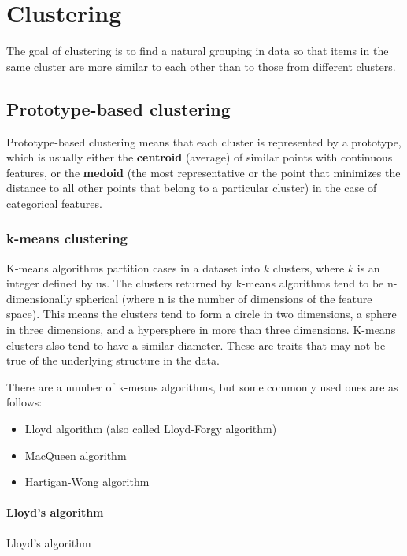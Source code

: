 \chapter{Clustering}
The goal of clustering is to find a natural grouping in data so that items in the same cluster are more similar to each other than to those from different clusters.
\section{Prototype-based clustering}
Prototype-based clustering means that each cluster is represented by a prototype, which is usually either the \textbf{centroid} (average) of similar points with continuous features, or the \textbf{medoid} (the most representative or the point that minimizes the distance to all other points that belong to a particular cluster) in the case of categorical features.
\subsection{k-means clustering}
K-means algorithms partition cases in a dataset into $k$ clusters, where $k$ is an integer defined by us. The clusters returned by k-means algorithms tend to be n-dimensionally spherical (where n is the number of dimensions of the feature space). This means the clusters tend to form a circle in two dimensions, a sphere in three dimensions, and a hypersphere in more than three dimensions. K-means clusters also tend to have a similar diameter. These are traits that may not be true of the underlying structure in the data.

There are a number of k-means algorithms, but some commonly used ones are as follows:
\begin{itemize}
    \item  Lloyd algorithm (also called Lloyd-Forgy algorithm)
    \item MacQueen algorithm
    \item Hartigan-Wong algorithm
\end{itemize}
\subsubsection*{Lloyd’s algorithm}
\begin{algorithm}
    \caption{Lloyd’s algorithm\label{Lloyd}}
\end{algorithm}

